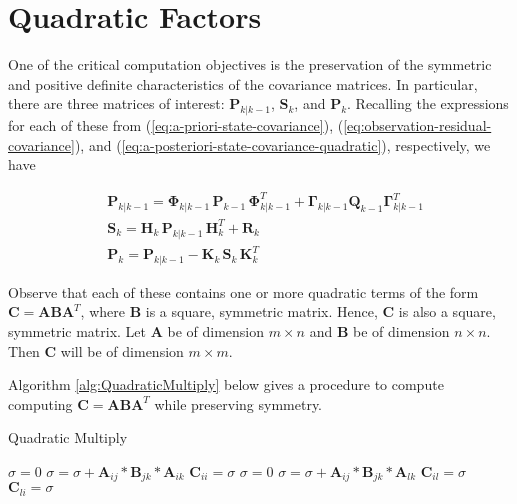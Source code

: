 \section{Quadratic Factors}
\label{Quadratic Factors}

One of the critical computation objectives is the preservation of the symmetric and
positive definite characteristics of the covariance matrices. In particular, there are
three matrices of interest: $\mathbf{P}_{k|k-1}$, $\mathbf{S}_k$, and $\mathbf{P}_k$.
Recalling the expressions for each of these from
(\ref{eq:a-priori-state-covariance}),
(\ref{eq:observation-residual-covariance}),
and (\ref{eq:a-posteriori-state-covariance-quadratic}),
respectively, we have

\begin{equation*}
    \begin{aligned}
        & \mathbf{P}_{k|k-1} = \mathbf{\Phi}_{k|k-1} \, \mathbf{P}_{k-1} \, \mathbf{\Phi}_{k|k-1}^T + \mathbf{\Gamma}_{k|k-1} \mathbf{Q}_{k-1} \mathbf{\Gamma}_{k|k-1}^T \\
        & \mathbf{S}_{k} = \mathbf{H}_{k} \, \mathbf{P}_{k|k-1} \, \mathbf{H}_{k}^T + \mathbf{R}_{k} \\
        & \mathbf{P}_k = \mathbf{P}_{k|k-1} - \mathbf{K}_{k} \, \mathbf{S}_{k} \, \mathbf{K}_{k}^T
    \end{aligned}
\end{equation*}

Observe that each of these contains one or more quadratic terms of the form $\mathbf{C} = \mathbf{A} \mathbf{B} \mathbf{A}^T$,
where $\mathbf{B}$ is a square, symmetric matrix. Hence, $\mathbf{C}$ is also a square,
symmetric matrix. Let $\mathbf{A}$ be of dimension $m \times n$ and $\mathbf{B}$ be of
dimension $n \times n$. Then $\mathbf{C}$ will be of dimension $m \times m$.

Algorithm \ref{alg:QuadraticMultiply} below gives a procedure to compute
computing $\mathbf{C} = \mathbf{A} \mathbf{B} \mathbf{A}^T$ while preserving symmetry.

\begin{algorithm}
    \caption{Quadratic Multiply}
    \label{alg:QuadraticMultiply}
    \begin{algorithmic}
            \STATE $\sigma = 0$
                    \STATE $\sigma = \sigma + \mathbf{A}_{ij} * \mathbf{B}_{jk} * \mathbf{A}_{ik}$
                \ENDFOR
            \ENDFOR
            \STATE $\mathbf{C}_{ii} = \sigma$
                \STATE $\sigma = 0$
                        \STATE $\sigma = \sigma + \mathbf{A}_{ij} * \mathbf{B}_{jk} * \mathbf{A}_{lk}$
                    \ENDFOR
                \ENDFOR
                \STATE $\mathbf{C}_{il} = \sigma$
                \STATE $\mathbf{C}_{li} = \sigma$
            \ENDFOR
        \ENDFOR
    \end{algorithmic}
\end{algorithm}

